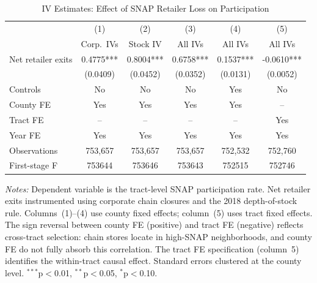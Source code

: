 \begin{table}[t]
\centering
\caption{IV Estimates: Effect of SNAP Retailer Loss on Participation}
\label{tab:iv}
\begin{threeparttable}
\begin{tabular}{lccccc}
\toprule
& (1) & (2) & (3) & (4) & (5) \\
& Corp.\ IVs & Stock IV & All IVs & All IVs & All IVs \\
\midrule
Net retailer exits & 0.4775*** & 0.8004*** & 0.6758*** & 0.1537*** & -0.0610*** \\
& (0.0409) & (0.0452) & (0.0352) & (0.0131) & (0.0052) \\
\midrule
Controls & No & No & No & Yes & No \\
County FE & Yes & Yes & Yes & Yes & -- \\
Tract FE & -- & -- & -- & -- & Yes \\
Year FE & Yes & Yes & Yes & Yes & Yes \\
\midrule
Observations & 753,657 & 753,657 & 753,657 & 752,532 & 752,760 \\
First-stage F & 753644 & 753646 & 753643 & 752515 & 752746 \\
\bottomrule
\end{tabular}
\begin{tablenotes}
\small
\item \textit{Notes:} Dependent variable is the tract-level SNAP participation rate. Net retailer exits instrumented using corporate chain closures and the 2018 depth-of-stock rule. Columns~(1)--(4) use county fixed effects; column~(5) uses tract fixed effects. The sign reversal between county FE (positive) and tract FE (negative) reflects cross-tract selection: chain stores locate in high-SNAP neighborhoods, and county FE do not fully absorb this correlation. The tract FE specification (column~5) identifies the within-tract causal effect. Standard errors clustered at the county level. $^{***}$p$<$0.01, $^{**}$p$<$0.05, $^{*}$p$<$0.10.
\end{tablenotes}
\end{threeparttable}
\end{table}

